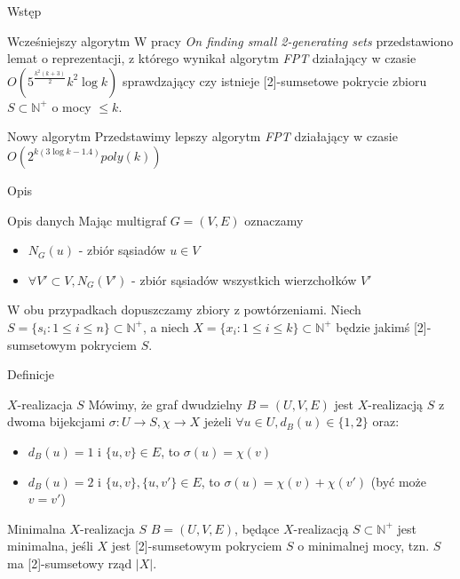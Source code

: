 \documentclass{beamer}
\newcommand{\N}{\mathbb{N}}
\begin{document}
		\begin{frame}{Wstęp}
            \begin{block}{Wcześniejszy algorytm}
                W pracy \emph{On finding small 2-generating sets} przedstawiono lemat o reprezentacji, z którego wynikał algorytm \emph{FPT} działający w czasie
                $ O\left( 5^{\frac{k^{2}(k+3)}{2}}k^{2}\log k \right) $ sprawdzający czy istnieje [2]-sumsetowe pokrycie zbioru $ S \subset \N^{+} $ o mocy $ \leq k $.
            \end{block}
            \begin{block}{Nowy algorytm}
                Przedstawimy lepszy algorytm \emph{FPT} działający w czasie
                $ O\left( 2^{k(3\log k-1.4)}poly(k) \right)$
            \end{block}
        \end{frame}
        \begin{frame}{Opis}
            \begin{block}{Opis danych}
                Mając multigraf $ G = (V,E) $ oznaczamy
                \begin{itemize}
                    \item $ N_{G}(u) $ - zbiór sąsiadów $ u \in V $
                    \item $ \forall V' \subset V, N_{G}(V') $ - zbiór sąsiadów wszystkich wierzchołków $ V' $
                \end{itemize}
                W obu przypadkach dopuszczamy zbiory z powtórzeniami.
                Niech $ S = \lbrace s_i : 1 \leq i \leq n \rbrace \subset \N^{+} $, a niech $ X = \lbrace x_i : 1 \leq i \leq k \rbrace \subset \N^{+} $ będzie jakimś [2]-sumsetowym pokryciem $ S $.
            \end{block}
        \end{frame}
        \begin{frame}{Definicje}
            \begin{block}{$ X $-realizacja $ S $}
                Mówimy, że graf dwudzielny $ B = (U,V,E) $ jest $ X $-realizacją $ S $ z dwoma bijekcjami $ \sigma : U \rightarrow S, \chi \rightarrow X $ jeżeli $ \forall u \in U, d_{B}(u) \in \lbrace 1,2 \rbrace $ oraz:
                \begin{itemize}
                    \item $ d_{B}(u) = 1 $ i $ \lbrace u, v \rbrace \in E $, to $ \sigma(u) = \chi(v) $
                    \item $ d_{B}(u) = 2 $ i $ \lbrace u, v \rbrace, \lbrace u, v' \rbrace \in E $, to $ \sigma(u) = \chi(v) + \chi(v') $ (być może $ v = v' $)
                \end{itemize}
            \end{block}
            \begin{block}{Minimalna $ X $-realizacja $ S $}
                $ B = (U,V,E) $, będące $ X $-realizacją $ S \subset \N^{+} $ jest minimalna, jeśli $ X $ jest [2]-sumsetowym pokryciem $ S $ o minimalnej mocy, tzn. $ S $ ma [2]-sumsetowy rząd $ |X| $.
            \end{block}
		\end{frame}
		
\end{document}
